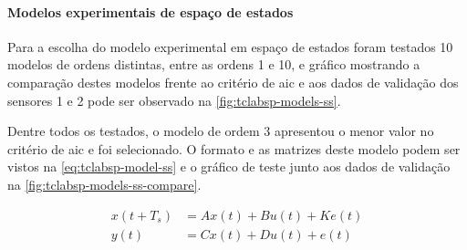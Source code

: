\paragraph*{\textbf{Modelos experimentais de espaço de estados}}
\label{par:modelos_experimentais_ss}

Para a escolha do modelo experimental em espaço de estados foram testados 10 modelos de ordens distintas,
entre as ordens 1 e 10, e gráfico mostrando a comparação destes modelos frente ao critério de \acrshort{aic}
e aos dados de validação dos sensores 1 e 2 pode ser observado na \cref{fig:tclabsp-models-ss}.

Dentre todos os testados, o modelo de ordem 3 apresentou o menor valor no critério de \acrshort{aic} e foi
selecionado. O formato e as matrizes deste modelo podem ser vistos na \cref{eq:tclabsp-model-ss}
e o gráfico de teste junto aos dados de validação na \cref{fig:tclabsp-models-ss-compare}.

\begin{equation}
	\label{eq:tclabsp-model-ss}
	\begin{aligned}
		x(t + T_s) &= Ax(t) + Bu(t) + Ke(t)	\\
		y(t) &= Cx(t) + Du(t) + e(t)		\\
	\end{aligned}
\end{equation}

